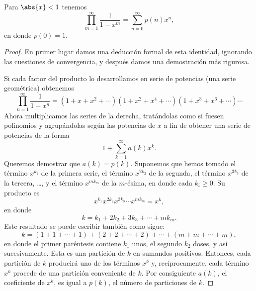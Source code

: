 \documentclass[12pt,a4paper]{book}
\begin{document}
    \begin{teorema}[Euler]\label{teo:14-2}
        Para $\abs{x}<1$ tenemos
        \begin{equation*}
            \prod_{m=1}^{\infty}\frac{1}{1-x^{m}}=\sum_{n=0}^{\infty}p(n)x^{n},
        \end{equation*}
        en donde $p(0)=1$.
    \end{teorema}

    \begin{proof}
        En primer lugar damos una deducción formal de esta identidad, ignorando las cuestiones
        de convergencia, y después damos una demostración más rigurosa.

        Si cada factor del producto lo desarrollamos en serie de potencias (una serie
        geométrica) obtenemos
        \begin{equation*}
            \prod_{n=1}^{\infty}\frac{1}{1-x^{n}}=(1+x+x^{2}+\cdots)(1+x^{2}+x^{4}+\cdots)(1+x^{3}+x^{6}+\cdots)\cdots
        \end{equation*}
        Ahora multiplicamos las series de la derecha, tratándolas como si fuesen polinomios y
        agrupándolas según las potencias de $x$ a fin de obtener una serie de potencias de la
        forma
        \begin{equation*}
            1+\sum_{k=1}^{\infty}a(k)x^{k}.
        \end{equation*}
        Queremos demostrar que $a(k)=p(k)$. Suponemos que hemos tomado el término $x^{k_{1}}$ de
        la primera serie, el término $x^{2k_{2}}$ de la segunda, el término $x^{3k_{3}}$ de la
        tercera, \dots, y el término $x^{mk_{m}}$ de la $m$-ésima, en donde cada $k_{i}\geq0$. Su
        producto es
        \begin{equation*}
            x^{k_{1}}x^{2k_{2}}x^{3k_{3}}\cdots x^{mk_{m}}=x^{k},
        \end{equation*}
        en donde
        \begin{equation*}
            k=k_{1}+2k_{2}+3k_{3}+\cdots+mk_{m}.
        \end{equation*}
        Este resultado se puede escribir también como sigue:
        \begin{equation*}
            k=(1+1+\cdots+1)+(2+2+\cdots+2)+\cdots+(m+m+\cdots+m),
        \end{equation*}
        en donde el primer paréntesis contiene $k_{1}$ unos, el segundo $k_{2}$ doses, y así
        sucesivamente. Esta es una partición de $k$ en sumandos positivos. Entonces, cada
        partición de $k$ producirá uno de los términos $x^{k}$ y, recíprocamente, cada término
        $x^{k}$ procede de una partición conveniente de $k$. Por consiguiente $a(k)$, el
        coeficiente de $x^{k}$, es igual a $p(k)$, el número de particiones de $k$.


\end{proof}
\end{document}
